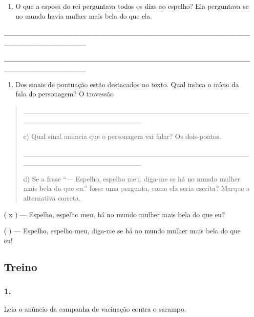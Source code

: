 \begin{enumerate}
\def\labelenumi{\alph{enumi})}
\item
  O que a esposa do rei perguntava todos os dias ao espelho? Ela
  perguntava se no mundo havia mulher mais bela do que ela.
\end{enumerate}

\_\_\_\_\_\_\_\_\_\_\_\_\_\_\_\_\_\_\_\_\_\_\_\_\_\_\_\_\_\_\_\_\_\_\_\_\_\_\_\_\_\_\_\_\_\_\_\_\_\_\_\_\_\_\_\_\_\_\_\_\_\_\_\_

\_\_\_\_\_\_\_\_\_\_\_\_\_\_\_\_\_\_\_\_\_\_\_\_\_\_\_\_\_\_\_\_\_\_\_\_\_\_\_\_\_\_\_\_\_\_\_\_\_\_\_\_\_\_\_\_\_\_\_\_\_\_\_\_

\begin{enumerate}
\def\labelenumi{\alph{enumi})}
\item
  Dos sinais de pontuação estão destacados no texto. Qual indica o
  início da fala do personagem? O travessão
\end{enumerate}

\begin{quote}
\protect\hypertarget{_Hlk127463829}{}{}\_\_\_\_\_\_\_\_\_\_\_\_\_\_\_\_\_\_\_\_\_\_\_\_\_\_\_\_\_\_\_\_\_\_\_\_\_\_\_\_\_\_\_\_\_\_\_\_\_\_\_\_\_\_\_\_\_\_\_\_\_\_\_\_\_\_\_

c) Qual sinal anuncia que o personagem vai falar? Os dois-pontos.

\_\_\_\_\_\_\_\_\_\_\_\_\_\_\_\_\_\_\_\_\_\_\_\_\_\_\_\_\_\_\_\_\_\_\_\_\_\_\_\_\_\_\_\_\_\_\_\_\_\_\_\_\_\_\_\_\_\_\_\_\_\_\_\_\_\_\_

d) Se a frase ``--- Espelho, espelho meu, diga-me se há no mundo mulher
mais bela do que eu.'' fosse uma pergunta, como ela seria escrita?
Marque a alternativa correta.
\end{quote}

( x ) --- Espelho, espelho meu, há no mundo mulher mais bela do que eu?

( ) --- Espelho, espelho meu, diga-me se há no mundo mulher mais bela do
que eu!

\subsection{Treino}\label{treino-2}

\subsubsection{1.}\label{section-36}

Leia o anúncio da campanha de vacinação contra o sarampo.

